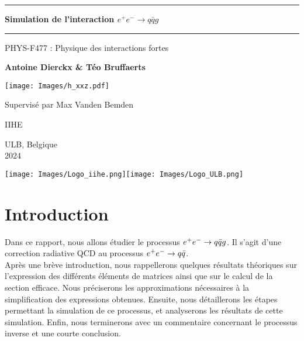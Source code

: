 \documentclass[a4paper]{article} %
\author{Téo Bruffart, Black Bloc de génération en génération ernAntoine Dierckx, Vicomte de Casterlé}
\date{Février 2024}
\numberwithin{equation}{section} %
\theoremstyle{definition}
\theoremstyle{remark}
\theoremstyle{plain}%
\theoremstyle{style_exemple}
\newcommand{\HRule}{\rule{\linewidth}{0.5mm}}
\begin{document}
    
\begin{titlepage}
    \begin{center}
        \HRule
        \vspace*{0.5cm}
        
        \Huge
        \textbf{Simulation de l'interaction $e^+e^-\rightarrow q\bar q g$}
        \HRule
        
        \vspace{.5cm}
        \Large
        PHYS-F477 : Physique des interactions fortes

        
        \vspace{.5cm}
        \LARGE
        \textbf{Antoine Dierckx \& Téo Bruffaerts}

        \vspace{.5cm}

        \texttt{[image: Images/h\_xxz.pdf]}%

        \vspace{.0cm}

        \LARGE
        Supervisé par Max Vanden Bemden

        \vspace{0.2cm}
            
        \large
        IIHE

        \vspace{0.2cm}
        ULB, Belgique\\
        2024


        
        \texttt{[image: Images/Logo\_iihe.png]}\hspace{9cm}\texttt{[image: Images/Logo\_ULB.png]}
        
    \end{center}

\end{titlepage}

\tableofcontents

\newpage

\section{Introduction}
Dans ce rapport, nous allons étudier le processus $e^+e^- \rightarrow  q \Bar{q} g$. Il s'agit d'une correction radiative QCD au processus $e^+e^- \rightarrow  q \Bar{q}$.\\
Après une brève introduction, nous rappellerons quelques résultats théoriques sur l'expression des différents éléments de matrices ainsi que sur le calcul de la section efficace. Nous préciserons les approximations nécessaires à la simplification des expressions obtenues. Ensuite, nous détaillerons les étapes permettant la simulation de ce processus, et analyserons les résultats de cette simulation. Enfin, nous terminerons avec un commentaire concernant le processus inverse et une courte conclusion. 
\end{document}
